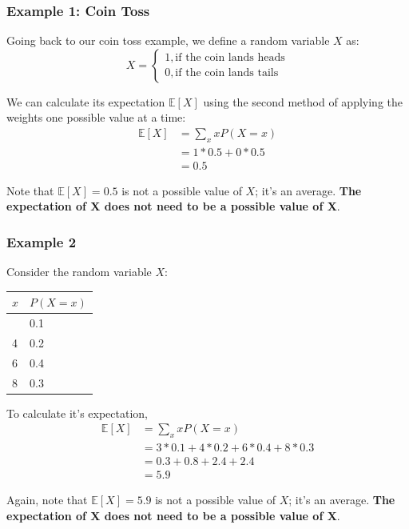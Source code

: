 \documentclass[
  letterpaper,
  DIV=11,
  numbers=noendperiod]{scrreprt}
\begin{document}
\subsubsection{Example 1: Coin Toss}\label{example-1-coin-toss}

Going back to our coin toss example, we define a random variable \(X\)
as: \[X = \begin{cases} 
      1, \text{if the coin lands heads} \\
      0, \text{if the coin lands tails} 
   \end{cases}\]

We can calculate its expectation \(\mathbb{E}[X]\) using the second
method of applying the weights one possible value at a time:
\[\begin{align}
 \mathbb{E}[X] &= \sum_{x} x P(X=x) \\
 &= 1 * 0.5 + 0 * 0.5 \\
 &= 0.5
\end{align}\]

Note that \(\mathbb{E}[X] = 0.5\) is not a possible value of \(X\); it's
an average. \textbf{The expectation of X does not need to be a possible
value of X}.

\subsubsection{Example 2}\label{example-2-1}

Consider the random variable \(X\):

\begin{longtable}[]{@{}ll@{}}
\toprule\noalign{}
\(x\) & \(P(X=x)\) \\
\midrule\noalign{}
\endhead
\bottomrule\noalign{}
\endlastfoot
3 & 0.1 \\
4 & 0.2 \\
6 & 0.4 \\
8 & 0.3 \\
\end{longtable}

To calculate it's expectation, \[\begin{align}
 \mathbb{E}[X] &= \sum_{x} x P(X=x) \\
 &= 3 * 0.1 + 4 * 0.2 + 6 * 0.4 + 8 * 0.3 \\
 &= 0.3 + 0.8 + 2.4 + 2.4 \\
 &= 5.9
\end{align}\]

Again, note that \(\mathbb{E}[X] = 5.9\) is not a possible value of
\(X\); it's an average. \textbf{The expectation of X does not need to be
a possible value of X}.
\end{document}
